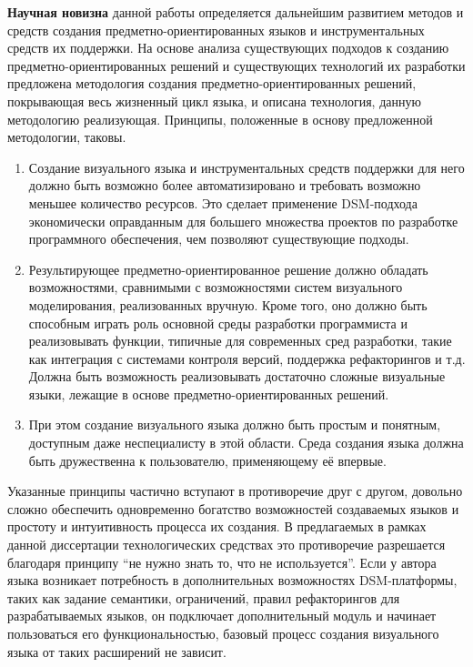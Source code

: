 \textbf{Научная новизна} данной работы определяется дальнейшим развитием методов и 
средств создания предметно-ориентированных языков и инструментальных средств их 
поддержки. На основе анализа существующих подходов к созданию 
предметно-ориентированных решений и существующих технологий их разработки 
предложена методология создания предметно-ориентированных решений, покрывающая 
весь жизненный цикл языка, и описана технология, данную методологию реализующая. 
Принципы, положенные в основу предложенной методологии, таковы.
\begin{enumerate}
	\item Создание визуального языка и инструментальных средств поддержки для него 
		должно быть возможно более автоматизировано и требовать возможно меньшее 
		количество ресурсов. Это сделает применение \ac{DSM}-подхода экономически 
		оправданным для большего множества проектов по разработке программного 
		обеспечения, чем позволяют существующие подходы.
	\item Результирующее предметно-ориентированное решение должно обладать 
		возможностями, сравнимыми с возможностями систем визуального моделирования, 
		реализованных вручную. Кроме того, оно должно быть способным играть 
		роль основной среды разработки программиста и реализовывать функции, 
		типичные для современных сред разработки, такие как интеграция с системами 
		контроля версий, поддержка рефакторингов и т.д. Должна быть возможность 
		реализовывать достаточно сложные визуальные языки, лежащие в основе 
		предметно-ориентированных решений.
	\item При этом создание визуального языка должно быть простым и понятным, 
		доступным даже неспециалисту в этой области. Среда создания языка должна 
		быть дружественна к пользователю, применяющему её впервые.
\end{enumerate}

Указанные принципы частично вступают в противоречие друг с другом, довольно 
сложно обеспечить одновременно богатство возможностей создаваемых языков и 
простоту и интуитивность процесса их создания. В предлагаемых в рамках данной 
диссертации технологических средствах это противоречие разрешается благодаря 
принципу "`не нужно знать то, что не используется"'. Если у автора языка 
возникает потребность в дополнительных возможностях DSM-платформы, таких как 
задание семантики, ограничений, правил рефакторингов для разрабатываемых языков, 
он подключает дополнительный модуль и начинает пользоваться его 
функциональностью, базовый процесс создания визуального языка от таких 
расширений не зависит.

